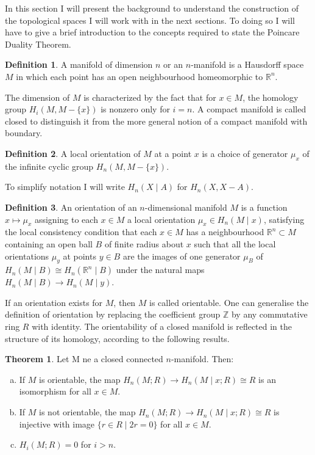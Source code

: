 \documentclass[A4,11pt,oneside]{book}
\theoremstyle{definition}
\newtheorem{teo}{Theorem}
\newtheorem{defi}{Definition}
\begin{document}
In this section I will present the background to understand the construction of the topological spaces I will work with in the next sections. To doing so I will have to give a brief introduction to the concepts required to
state the Poincare Duality Theorem.

\begin{defi}
A manifold of dimension $n$ or an $n$-manifold is a Hausdorff space $M$ in which each point has an open neighbourhood homeomorphic to $\mathbb{R}^n$. 
\end{defi}

The dimension of $M$ is characterized by the fact that for $x\in M$, the homology group $H_i(M,M-\{x\})$ is nonzero only for $i=n$. A compact manifold is called closed  to distinguish it from the more general notion of a compact manifold with boundary. 

\begin{defi}
A local orientation of $M$ at a point $x$ is a choice of generator $\mu_x$ of the infinite cyclic group $H_n(M,M-\{x\})$. 
\end{defi}
To simplify notation I will write $H_n(X\mid A)$ for $H_n(X,X-A)$.

\begin{defi}
An orientation of an $n$-dimensional manifold $M$ is a function $x\mapsto\mu_x$ assigning to each $x\in M$ a local orientation $\mu_x\in H_n(M\mid x)$, satisfying the local consistency condition that each  $x\in M$ has a neighbourhood $\mathbb{R}^n\subset M$ containing an open ball $B$ of finite radius about $x$ such that all the local orientations $\mu_y$ at points $y\in B$ are the images of one generator $\mu_B$ of $H_n(M\mid B)\cong H_n(\mathbb{R}^n\mid B)$ under the natural maps $H_n(M\mid B)\rightarrow H_n(M\mid y)$. 
\end{defi}
If an orientation exists for $M$, then $M$ is called orientable. One can generalise the definition of orientation by replacing the coefficient group $\mathbb{Z}$ by any commutative ring $R$ with identity. The orientability of a closed manifold is reflected in the structure of its homology, according to the following results.

\begin{teo}
Let M ne a closed connected $n$-manifold. Then:
\begin{enumerate}[a)]
\item  If $M$ is orientable, the map $H_n(M;R)\rightarrow H_n(M\mid x;R)\cong R$ is an isomorphism for all $x\in M$.
\item If $M$ is not orientable, the map $H_n(M;R)\rightarrow H_n(M\mid x;R)\cong R$ is injective with image $\{r\in R\mid 2r=0\}$ for all $x\in M$.
\item $H_i(M;R)=0$ for $i>n$.
\end{enumerate}
\end{teo}
\end{document}
